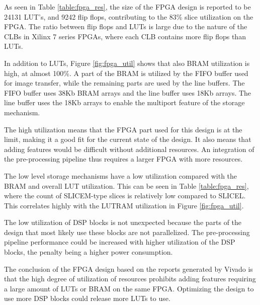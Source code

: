 \documentclass[12pt]{report}
\begin{document}
As seen in Table \ref*{table:fpga_res}, the size of the FPGA design is reported to be 24131 LUT's, and 9242 flip flops, contributing to the 83\% slice utilization on the FPGA. The ratio between flip flops and LUTs is large due to the nature of the CLBs in Xilinx 7 series FPGAs, where each CLB contains more flip flops than LUTs.
\par
In addition to LUTs, Figure \ref*{fig:fpga_util} shows that also BRAM utilization is high, at almost 100\%. A part of the BRAM is utilized by the FIFO buffer used for image transfer, while the remaining parts are used by the line buffers. The FIFO buffer uses 38Kb BRAM arrays and the line buffer uses 18Kb arrays. The line buffer uses the 18Kb arrays to enable the multiport feature of the storage mechanism.
\par
The high utilization means that the FPGA part used for this design is at the limit, making it a good fit for the current state of the design. It also means that adding features would be difficult without additional resources. An integration of the pre-processing pipeline thus requires a larger FPGA with more resources.
\par
The low level storage mechanisms have a low utilization compared with the BRAM and overall LUT utilization. This can be seen in Table \ref*{table:fpga_res}, where the count of SLICEM-type slices is relatively low compared to SLICEL. This correlates highly with the LUTRAM utilization in Figure \ref*{fig:fpga_util}.
\par
The low utilization of DSP blocks is not unexpected because the parts of the design that most likely use these blocks are not parallelized. The pre-processing pipeline performance could be increased with higher utilization of the DSP blocks, the penalty being a higher power consumption. 
\par
The conclusion of the FPGA design based on the reports generated by Vivado is that the high degree of utilization of resources prohibits adding features requiring a large amount of LUTs or BRAM on the same FPGA. Optimizing the design to use more DSP blocks could release more LUTs to use.
 



\end{document}
